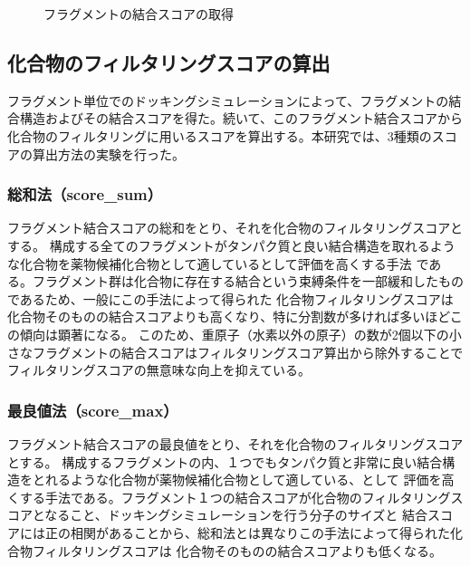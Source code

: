 \begin{figure}[htp]
 \begin{center}
  \caption{フラグメントの結合スコアの取得}
  \label{fig:fragment_result}
 \end{center}
\end{figure}

\subsection{化合物のフィルタリングスコアの算出}
フラグメント単位でのドッキングシミュレーションによって、フラグメントの結合構造およびその結合スコアを得た。続いて、このフラグメント結合スコアから
化合物のフィルタリングに用いるスコアを算出する。本研究では、3種類のスコアの算出方法の実験を行った。

\subsubsection{総和法（score\_sum）}
フラグメント結合スコアの総和をとり、それを化合物のフィルタリングスコアとする。
構成する全てのフラグメントがタンパク質と良い結合構造を取れるような化合物を薬物候補化合物として適しているとして評価を高くする手法
である。フラグメント群は化合物に存在する結合という束縛条件を一部緩和したものであるため、一般にこの手法によって得られた
化合物フィルタリングスコアは化合物そのものの結合スコアよりも高くなり、特に分割数が多ければ多いほどこの傾向は顕著になる。
このため、重原子（水素以外の原子）の数が2個以下の小さなフラグメントの結合スコアはフィルタリングスコア算出から除外することで
フィルタリングスコアの無意味な向上を抑えている。

\subsubsection{最良値法（score\_max）}
フラグメント結合スコアの最良値をとり、それを化合物のフィルタリングスコアとする。
構成するフラグメントの内、１つでもタンパク質と非常に良い結合構造をとれるような化合物が薬物候補化合物として適している、として
評価を高くする手法である。フラグメント１つの結合スコアが化合物のフィルタリングスコアとなること、ドッキングシミュレーションを行う分子のサイズと
結合スコアには正の相関がある\cite{Verdonk2004}ことから、総和法とは異なりこの手法によって得られた化合物フィルタリングスコアは
化合物そのものの結合スコアよりも低くなる。

